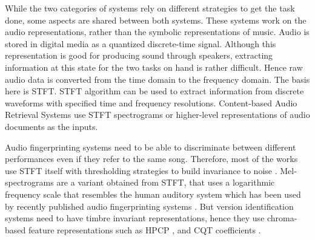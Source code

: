 \documentclass[../main.tex]{subfiles}
\begin{document}
\par
While the two categories of systems rely on different strategies to get the task done, some aspects are shared between both systems. These systems work on the audio representations, rather than the symbolic representations of music. Audio is stored in digital media as a quantized discrete-time signal. Although this representation is good for producing sound through speakers, extracting information at this state for the two tasks on hand is rather difficult. Hence raw audio data is converted from the time domain to the frequency domain. The basis here is \Gls{STFT}.  \Gls{STFT} algorithm can be used to extract information from discrete waveforms with specified time and frequency resolutions. Content-based Audio Retrieval Systems use \gls{STFT} spectrograms or higher-level representations of audio documents as the inputs.

\iffalse
Figure \ref{fig:representations} shows some of these representations \cite{book}.

\begin{figure}[H]
    \centering
    \texttt{[image: representations.png]}
    \caption{Various representations for a recording of the chromatic scale played on a real piano. (a) Piano keys representing the chromatic scale. (b) Magnitude spectrogram. (c) Pitch-based log-frequency spectrogram. (d) Chromagram.}
    \label{fig:representations}
\end{figure}
\fi


\par
Audio fingerprinting systems need to be able to discriminate between different performances even if they refer to the same song. Therefore, most of the works use \gls{STFT} itself with thresholding strategies to build invariance to noise \cite{haitsmaHighlyRobustAudio2002,sift,ellisEchoPrintOpenSource2011,wangIndustrialStrengthAudio2003,computer_vision_for_music_identification}. Mel-spectrograms are a variant obtained from \gls{STFT}, that uses a logarithmic frequency scale that resembles the human auditory system which has been used by recently published audio fingerprinting systems \cite{yu_contrastive_2020,baez_suarez_unsupervised_2020}. But version identification systems need to have timbre invariant representations, hence they use chroma-based feature representations such as \gls{HPCP} \cite{gomezSongRemainsSame2006,serraChromaBinarySimilarity2008,serraCrossRecurrenceQuantification2009,yesilerAccurateScalableVersion2020}, and \gls{CQT} coefficients \cite{yuTemporalPyramidPooling2019,dorasCoverDetectionUsing2019,jiang_yang_chen_2020}.
\end{document}
